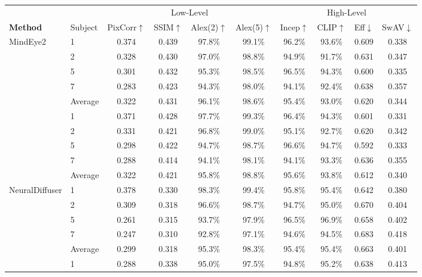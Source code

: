 \documentclass[letterpaper]{article} %
\begin{document}
\begin{table}[tp]
\vspace{2em}
\begin{tabular*}{\textwidth}{@{\extracolsep{\fill}}p{5.2cm}p{1.3cm}cccccccc@{}}
\toprule
& & \multicolumn{4}{c}{Low-Level} & \multicolumn{4}{c}{High-Level} \\
\cmidrule(lr){3-6}\cmidrule(lr){7-10}
\textbf{Method} & Subject
& PixCorr$\uparrow$ & SSIM$\uparrow$ & Alex(2)$\uparrow$ & Alex(5)$\uparrow$
& Incep$\uparrow$ & CLIP$\uparrow$ & Eff$\downarrow$ & SwAV$\downarrow$ \\
\midrule
\multirow{6}{*}{MindEye2 \cite{scotti2024mindeye2sharedsubjectmodelsenable}} & 1 & 0.374 & 0.439 & 97.8\% & 99.1\% & 96.2\% & 93.6\% & 0.609 & 0.338 \\
 & 2 & 0.328 & 0.430 & 97.0\% & 98.8\% & 94.9\% & 91.7\% & 0.631 & 0.347 \\
 & 5 & 0.301 & 0.432 & 95.3\% & 98.5\% & 96.5\% & 94.3\% & 0.600 & 0.335 \\
 & 7 & 0.283 & 0.423 & 94.3\% & 98.0\% & 94.1\% & 92.4\% & 0.638 & 0.357 \\
\cmidrule(l){2-10}
 & Average & 0.322 & 0.431 & 96.1\% & 98.6\% & 95.4\% & 93.0\% & 0.620 & 0.344 \\
\midrule
\multirow{6}{*}{MindTuner \cite{gong2024mindtunercrosssubjectvisualdecoding}} & 1 & 0.371 & 0.428 & 97.7\% & 99.3\% & 96.4\% & 94.3\% & 0.601 & 0.331 \\
 & 2 & 0.331 & 0.421 & 96.8\% & 99.0\% & 95.1\% & 92.7\% & 0.620 & 0.342 \\
 & 5 & 0.298 & 0.422 & 94.7\% & 98.7\% & 96.6\% & 94.7\% & 0.592 & 0.333 \\
 & 7 & 0.288 & 0.414 & 94.1\% & 98.1\% & 94.1\% & 93.3\% & 0.636 & 0.355 \\
\cmidrule(l){2-10}
 & Average & 0.322 & 0.421 & 95.8\% & 98.8\% & 95.6\% & 93.8\% & 0.612 & 0.340 \\
\midrule
\multirow{6}{*}{NeuralDiffuser \cite{Li_2025}} & 1 & 0.378 & 0.330 & 98.3\% & 99.4\% & 95.8\% & 95.4\% & 0.642 & 0.380 \\
 & 2 & 0.309 & 0.318 & 96.6\% & 98.7\% & 94.7\% & 95.0\% & 0.670 & 0.404 \\
 & 5 & 0.261 & 0.315 & 93.7\% & 97.9\% & 96.5\% & 96.9\% & 0.658 & 0.402 \\
 & 7 & 0.247 & 0.310 & 92.8\% & 97.1\% & 94.6\% & 94.5\% & 0.683 & 0.418 \\
\cmidrule(l){2-10}
 & Average & 0.299 & 0.318 & 95.3\% & 98.3\% & 95.4\% & 95.4\% & 0.663 & 0.401 \\
\midrule
\multirow{6}{*}{DREAM \cite{xia2024dreamvisualdecodingreversing}} & 1 & 0.288 & 0.338 & 95.0\% & 97.5\% & 94.8\% & 95.2\% & 0.638 & 0.413 \\

\end{tabular*}
\end{table}
\end{document}
